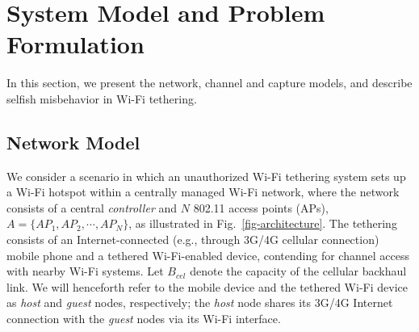 
\section{System Model and Problem Formulation}

In this section, we present the network, channel and capture models,
and describe selfish misbehavior in Wi-Fi tethering.

\subsection{Network Model}
%
\begin{figure}[hbt]
\end{figure}
%
We consider a scenario in which an unauthorized Wi-Fi tethering system
sets up a Wi-Fi hotspot within a centrally managed Wi-Fi network,
where the network consists of a central \emph{controller} and
$N$ 802.11 access points (APs), $A=\{AP_1, AP_2, \cdots, AP_N\}$,
as illustrated in Fig.~\ref{fig-architecture}.
%
The tethering consists of an Internet-connected
(e.g., through 3G/4G cellular connection) mobile phone and a
tethered Wi-Fi-enabled device, contending for channel access
with nearby Wi-Fi systems.
Let $B_{cel}$ denote the capacity of the cellular backhaul link.
%
We will henceforth refer to the mobile device and the tethered
Wi-Fi device as \emph{host} and \emph{guest} nodes, respectively;
the \emph{host} node shares its 3G/4G Internet connection
with the \emph{guest} nodes via its Wi-Fi interface.
%


